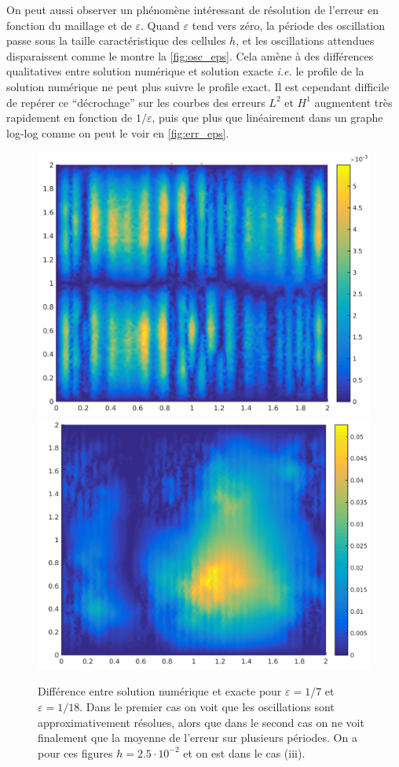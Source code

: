 \documentclass[11pt]{article}
\newcommand{\ie}{\emph{i.e.} }
\begin{document}
On peut aussi observer un phénomène intéressant de résolution de l'erreur en fonction du maillage et de $\varepsilon$. Quand $\varepsilon$ tend vers
zéro, la période des oscillation passe sous la taille caractéristique des cellules $h$, et les oscillations attendues disparaissent comme le montre la
\autoref{fig:osc_eps}. Cela amène à des différences qualitatives entre solution numérique et solution exacte \ie le profile de la solution numérique
ne peut plus suivre le profile exact. Il est cependant difficile de repérer ce ``décrochage'' sur les courbes des erreurs $L^2$ et $H^1$ augmentent
très rapidement en fonction de $1/\varepsilon$, puis que plus que linéairement dans un graphe log-log comme on peut le voir en
\autoref{fig:err_eps}.   
\begin{figure}
  \centering
  \includegraphics[height=.25\textheight]{SolutionExacte/limit_res_eps7} 
  \includegraphics[height=.25\textheight]{SolutionExacte/non_res_eps18}   
  \caption{Différence entre solution numérique et exacte pour $\varepsilon=1/7$ et $\varepsilon=1/18$. Dans le premier cas on voit que les
    oscillations sont approximativement résolues, alors que dans le second cas on ne voit finalement que la moyenne de l'erreur sur plusieurs
    périodes. On a pour ces figures $h=2.5\cdot10^{-2}$ et on est dans le cas (iii).}
  \label{fig:osc_eps}
\end{figure}
\end{document}
